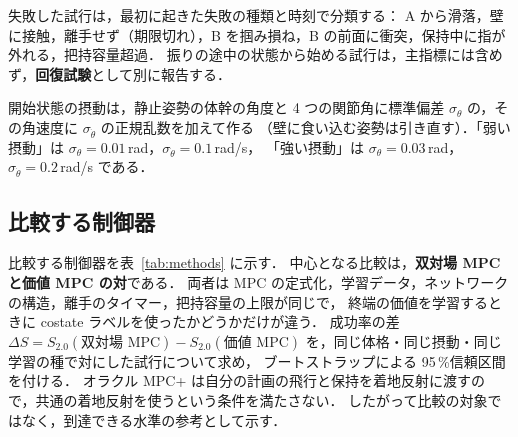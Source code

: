 失敗した試行は，最初に起きた失敗の種類と時刻で分類する：
A から滑落，壁に接触，離手せず（期限切れ），B を掴み損ね，B の前面に衝突，保持中に指が外れる，把持容量超過．
振りの途中の状態から始める試行は，主指標には含めず，\textbf{回復試験}として別に報告する．

開始状態の摂動は，静止姿勢の体幹の角度と 4 つの関節角に標準偏差 $\sigma_\theta$ の，その角速度に $\sigma_{\dot\theta}$ の正規乱数を加えて作る
（壁に食い込む姿勢は引き直す）．「弱い摂動」は $\sigma_\theta=0.01$\,rad，$\sigma_{\dot\theta}=0.1$\,rad/s，
「強い摂動」は $\sigma_\theta=0.03$\,rad，$\sigma_{\dot\theta}=0.2$\,rad/s である．

\subsection{比較する制御器}
比較する制御器を表~\ref{tab:methods} に示す．
中心となる比較は，\textbf{双対場 MPC と価値 MPC の対}である．
両者は MPC の定式化，学習データ，ネットワークの構造，離手のタイマー，把持容量の上限が同じで，
終端の価値を学習するときに costate ラベルを使ったかどうかだけが違う．
成功率の差 $\Delta S=S_{2.0}(\text{双対場 MPC})-S_{2.0}(\text{価値 MPC})$ を，同じ体格・同じ摂動・同じ学習の種で対にした試行について求め，
ブートストラップによる 95\,\%信頼区間を付ける．
オラクル MPC+ は自分の計画の飛行と保持を着地反射に渡すので，共通の着地反射を使うという条件を満たさない．
したがって比較の対象ではなく，到達できる水準の参考として示す．
\begin{table}[t]
\centering\scriptsize
\caption{比較する制御器．すべて同じ環境，同じ $\Fmax$，同じ実行系（制御周期 2\,ms）で評価する．着地反射の「共通」は保存した参照解を使うことを表す．}
\label{tab:methods}
\end{table}
